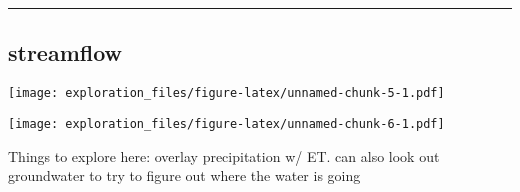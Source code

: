 \documentclass[]{article}
\begin{document}
\begin{center}\rule{0.5\linewidth}{\linethickness}\end{center}

\subsection{streamflow}\label{streamflow}

\texttt{[image: exploration\_files/figure-latex/unnamed-chunk-5-1.pdf]}

\texttt{[image: exploration\_files/figure-latex/unnamed-chunk-6-1.pdf]}

Things to explore here: overlay precipitation w/ ET. can also look out
groundwater to try to figure out where the water is going
\end{document}
